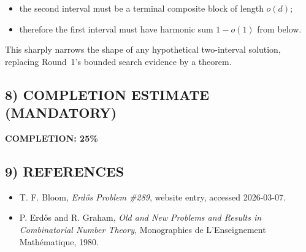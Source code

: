 \begin{itemize}
	\item the second interval must be a terminal composite block of length $o(d)$;
	\item therefore the first interval must have harmonic sum $1-o(1)$ from below.
\end{itemize}

This sharply narrows the shape of any hypothetical two-interval solution, replacing Round~1's bounded search evidence by a theorem.

\subsection*{8) COMPLETION ESTIMATE (MANDATORY)}
\textbf{COMPLETION: 25\%}

\subsection*{9) REFERENCES}
\begin{itemize}
	\item [Er289] T. F. Bloom, \emph{Erd\H{o}s Problem \#289}, website entry, accessed 2026-03-07.
	\item [ErGr80] P. Erd\H{o}s and R. Graham, \emph{Old and New Problems and Results in Combinatorial Number Theory}, Monographies de L'Enseignement Math\'ematique, 1980.
\end{itemize}


